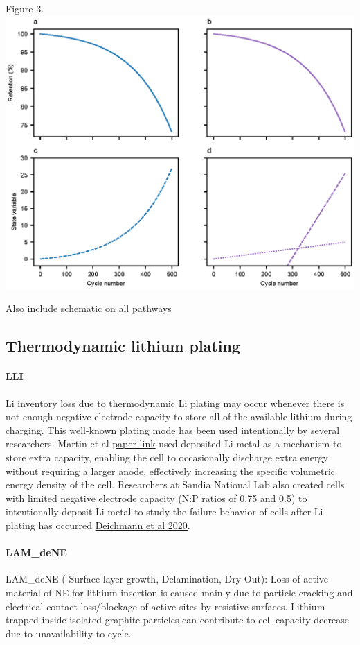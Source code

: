 \documentclass{article}
\begin{document}
Figure 3. 
{
\centering
\includegraphics[scale=1]{figures/snowball_vs_hidden_mechanism.eps}
}

Also include schematic on all pathways

\subsection{Thermodynamic lithium plating}
\paragraph{LLI}
Li inventory loss due to thermodynamic Li plating may occur whenever there is not enough negative electrode capacity to store all of the available lithium during charging. This well-known plating mode has been used intentionally by several researchers. Martin et al \href{https://www.sciencedirect.com/science/article/abs/pii/S2542435120301720}{paper link} used deposited Li metal as a mechanism to store extra capacity, enabling the cell to occasionally discharge extra energy without requiring a larger anode, effectively increasing the specific volumetric energy density of the cell. Researchers at Sandia National Lab also created cells with limited negative electrode capacity (N:P ratios of 0.75 and 0.5) to intentionally deposit Li metal to study the failure behavior of cells after Li plating has occurred \href{https://iopscience.iop.org/article/10.1149/1945-7111/ab9941/pdf}{Deichmann et al 2020}.
\paragraph{LAM_{deNE}}
LAM_deNE ( Surface layer growth, Delamination, Dry Out):
Loss of active material of NE for lithium insertion is caused mainly due to particle cracking and electrical contact loss/blockage of active sites by resistive surfaces. Lithium trapped inside isolated graphite particles can contribute to cell capacity decrease due to unavailability to cycle. 
\end{document}

